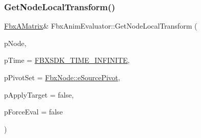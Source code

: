 \subsubsection{\texorpdfstring{Get\+Node\+Local\+Transform()}{GetNodeLocalTransform()}}
{\footnotesize\ttfamily \hyperlink{class_fbx_a_matrix}{Fbx\+A\+Matrix}\& Fbx\+Anim\+Evaluator\+::\+Get\+Node\+Local\+Transform (\begin{DoxyParamCaption}\item[{\hyperlink{class_fbx_node}{Fbx\+Node} $\ast$}]{p\+Node,  }\item[{const \hyperlink{class_fbx_time}{Fbx\+Time} \&}]{p\+Time = {\ttfamily \hyperlink{fbxtime_8h_a1e6db3fe0f84f0b7daa775739f93526f}{F\+B\+X\+S\+D\+K\+\_\+\+T\+I\+M\+E\+\_\+\+I\+N\+F\+I\+N\+I\+TE}},  }\item[{\hyperlink{class_fbx_node_ae62b7311ac4727654cdf1ebd5cbf7343}{Fbx\+Node\+::\+E\+Pivot\+Set}}]{p\+Pivot\+Set = {\ttfamily \hyperlink{class_fbx_node_ae62b7311ac4727654cdf1ebd5cbf7343ae8ed37a5c7e41f8d1cec9d3fa8424b69}{Fbx\+Node\+::e\+Source\+Pivot}},  }\item[{bool}]{p\+Apply\+Target = {\ttfamily false},  }\item[{bool}]{p\+Force\+Eval = {\ttfamily false} }\end{DoxyParamCaption})}

